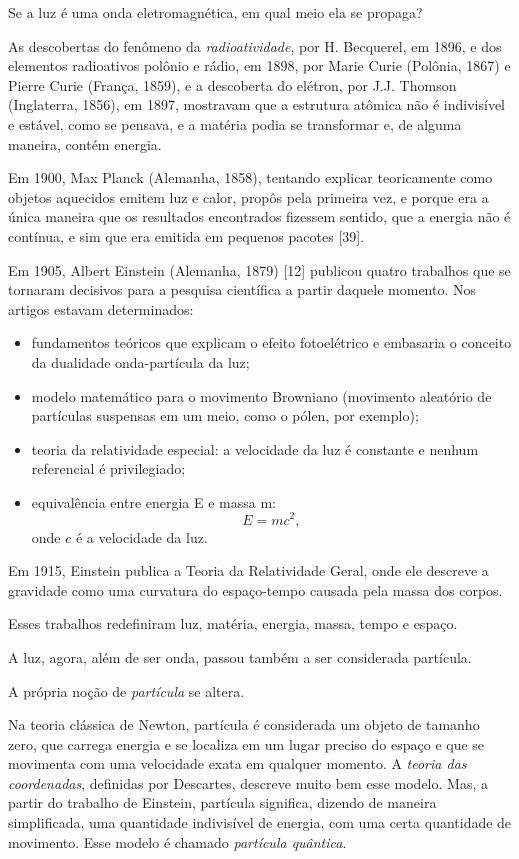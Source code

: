 \documentclass{hipatia}
\begin{document}
Se a luz é uma onda eletromagnética, em qual meio ela se propaga?

As descobertas do fenômeno da \textit{radioatividade}, por H. Becquerel, em 1896, e dos elementos radioativos polônio e rádio, em 1898, por Marie Curie (Polônia, 1867) e Pierre Curie (França, 1859), e a descoberta do elétron, por J.J. Thomson (Inglaterra, 1856), em 1897, mostravam que a estrutura atômica não é indivisível e estável, como se pensava, e a matéria podia se transformar e, de alguma maneira, contém energia.

Em 1900, Max Planck (Alemanha, 1858), tentando explicar teoricamente como objetos aquecidos emitem luz e calor, propôs pela primeira vez, e porque era a única maneira que os resultados encontrados fizessem sentido, que a energia não é contínua, e sim que era emitida em pequenos pacotes [39].

Em 1905, Albert Einstein (Alemanha, 1879) [12] publicou quatro trabalhos que se  tornaram decisivos para a pesquisa científica a partir daquele momento. Nos artigos estavam determinados:

\begin{itemize}
    \item fundamentos teóricos que explicam o efeito fotoelétrico e embasaria o conceito da dualidade onda-partícula da luz;
\item  modelo matemático para o movimento Browniano (movimento aleatório de partículas suspensas em um meio, como o pólen, por exemplo);
\item teoria da relatividade especial: a velocidade da luz é constante e nenhum referencial é privilegiado;
\item equivalência entre energia E e massa m: $$E = m c^2,$$ onde $c$ é a velocidade da luz.
\end{itemize}


Em 1915, Einstein publica a Teoria da Relatividade Geral, onde ele descreve a gravidade como uma curvatura do espaço-tempo causada pela massa dos corpos.

Esses trabalhos redefiniram luz, matéria, energia, massa, tempo e espaço.

A luz, agora, além de ser onda, passou também a ser considerada partícula.

A própria noção de \textit{partícula} se altera.

Na teoria clássica de Newton, partícula é considerada um objeto de tamanho zero, que carrega energia e se localiza em um lugar preciso do espaço e que se movimenta com uma velocidade exata em qualquer momento. A \textit{teoria das coordenadas}, definidas por Descartes, descreve muito bem esse modelo. Mas, a partir do trabalho de Einstein, partícula significa, dizendo de maneira simplificada, uma quantidade indivisível de energia, com uma certa quantidade de movimento. Esse modelo é chamado \textit{partícula quântica}.
\end{document}
